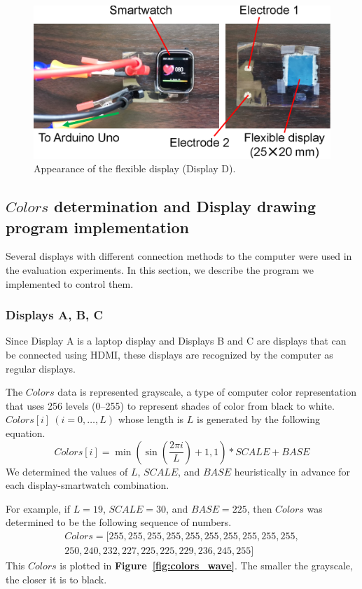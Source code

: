 \documentclass[sigchi,authordraft]{acmart}
\newcommand\figref[1]{\textbf{Figure~\ref{fig:#1}}}
\begin{document}
\begin{figure}[!t]
  \centering
  \includegraphics[width=0.75\linewidth]{figures/flexible.eps}
  \caption{Appearance of the flexible display (Display D).}
  \label{fig:flexible}
\end{figure}


\subsection{$Colors$ determination and Display drawing program implementation}
\label{subsec:colors_and_program}
Several displays with different connection methods to the computer were used in the evaluation experiments. In this section, we describe the program we implemented to control them.

\subsubsection{Displays A, B, C}
Since Display A is a laptop display and Displays B and C are displays that can be connected using HDMI, these displays are recognized by the computer as regular displays.\par

The $Colors$ data is represented grayscale, a type of computer color representation that uses 256 levels (0--255) to represent shades of color from black to white. $Colors[i]~(i=0,\dots,L)$ whose length is $L$ is generated by the following equation.
\begin{equation}
  Colors[i]=\min\left(\sin\left(\frac{2\pi i}{L}\right)+1,1\right)*SCALE+BASE
\end{equation}
We determined the values of $L$, $SCALE$, and $BASE$ heuristically in advance for each display-smartwatch combination.\par

For example, if $L=19$, $SCALE=30$, and $BASE=225$, then $Colors$ was determined to be the following sequence of numbers.
\begin{equation*}
  \begin{split}
    Colors = [255, 255, 255, 255, 255, 255, 255, 255, 255, 255,\\250, 240, 232, 227, 225, 225, 229, 236, 245, 255]
  \end{split}
\end{equation*}
This $Colors$ is plotted in \figref{colors_wave}. The smaller the grayscale, the closer it is to black.\par
\end{document}
